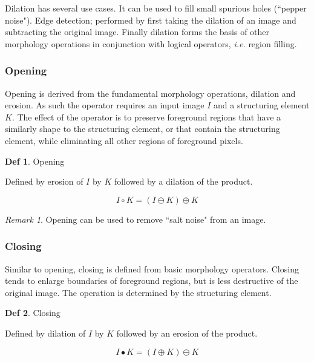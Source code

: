 \documentclass{article}
\theoremstyle{definition}
\newtheorem{df}{Def}
\theoremstyle{remark}
\newtheorem*{rem}{Remark}
\begin{document}
Dilation has several use cases. It can be used to fill small spurious holes (``pepper noise"). Edge detection; performed by first taking the dilation of an image and subtracting the original image. Finally dilation forms the basis of other morphology operations in conjunction with logical operators, \textit{i.e.} region filling.


\subsubsection{Opening}

Opening is derived from the fundamental morphology operations, dilation and erosion. As such the operator requires an input image $ I $ and a structuring element $ K $. The effect of the operator is to preserve foreground regions that have a similarly shape to the structuring element, or that contain the structuring element, while eliminating all other regions of foreground pixels. 

\begin{df}Opening

Defined by erosion of $ I $ by $ K $ followed by a dilation of the product.

\begin{equation}
    I \circ K = (I \ominus K) \oplus K
\end{equation}
\end{df}

\begin{rem}
Opening can be used to remove ``salt noise" from an image. 
\end{rem}


\subsubsection{Closing}


Similar to opening, closing is defined from basic morphology operators. Closing tends to enlarge boundaries of foreground regions, but is less destructive of the original image. The operation is determined by the structuring element.


\begin{df}Closing

Defined by dilation of $ I $ by $ K $ followed by an erosion of the product.

\begin{equation}
    I \bullet K = (I \oplus K) \ominus K
\end{equation}
\end{df}
\end{document}
